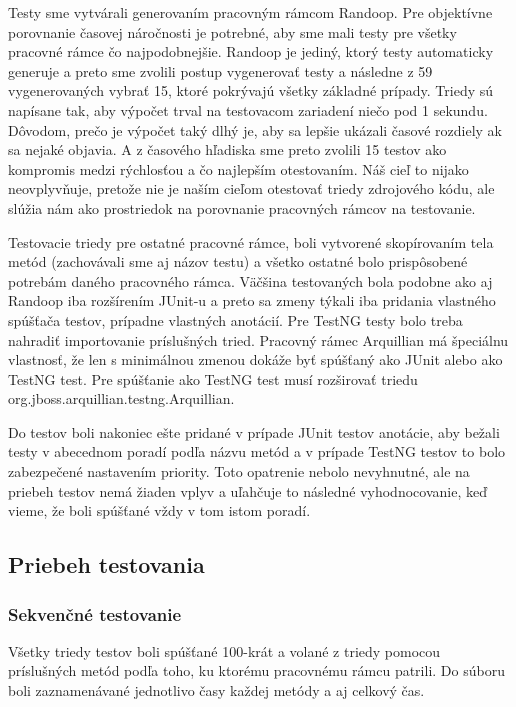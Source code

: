 \documentclass[11pt,twoside,slovak,a4paper]{article}
\begin{document}
	Testy sme vytvárali generovaním pracovným rámcom Randoop. Pre objektívne porovnanie časovej náročnosti je potrebné, aby sme mali testy pre všetky pracovné rámce čo najpodobnejšie. Randoop je jediný, ktorý testy automaticky generuje a preto sme zvolili postup vygenerovať testy a následne z 59 vygenerovaných vybrať 15, ktoré pokrývajú všetky základné prípady. Triedy sú napísane tak, aby výpočet trval na testovacom zariadení niečo pod 1 sekundu. Dôvodom, prečo je výpočet taký dlhý je, aby sa lepšie ukázali časové rozdiely ak sa nejaké objavia. A z časového hľadiska sme preto zvolili 15 testov ako kompromis medzi rýchlosťou a čo najlepším otestovaním. Náš cieľ to nijako neovplyvňuje, pretože nie je naším cieľom otestovať triedy zdrojového kódu, ale slúžia nám ako prostriedok na porovnanie pracovných rámcov na testovanie.
	
	Testovacie triedy pre ostatné pracovné rámce, boli vytvorené skopírovaním tela metód (zachovávali sme aj názov testu) a všetko ostatné bolo prispôsobené potrebám daného pracovného rámca. Väčšina testovaných bola podobne ako aj Randoop iba rozšírením JUnit-u a preto sa zmeny týkali iba pridania vlastného spúšťača testov, prípadne vlastných anotácií. Pre TestNG testy bolo treba nahradiť importovanie príslušných tried. Pracovný rámec Arquillian má špeciálnu vlastnosť, že len s minimálnou zmenou dokáže byť spúšťaný ako JUnit alebo ako TestNG test. Pre spúšťanie ako TestNG test musí rozširovať triedu org.jboss.arquillian.testng.Arquillian.
	
	Do testov boli nakoniec ešte pridané v prípade JUnit testov anotácie, aby bežali testy v abecednom poradí podľa názvu metód a v prípade TestNG testov to bolo zabezpečené nastavením priority. Toto opatrenie nebolo nevyhnutné, ale na priebeh testov nemá žiaden vplyv a uľahčuje to následné vyhodnocovanie, keď vieme, že boli spúšťané vždy v tom istom poradí.
	
	\subsection{Priebeh testovania}
	
	\subsubsection{Sekvenčné testovanie}
	Všetky triedy testov boli spúšťané 100-krát a volané z triedy pomocou príslušných metód podľa toho, ku ktorému pracovnému rámcu patrili. Do súboru boli zaznamenávané jednotlivo časy každej metódy a aj celkový čas.
	
\end{document}
